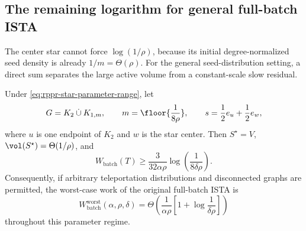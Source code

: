 \subsection{The remaining logarithm for general full-batch ISTA}
\label{subsec:rppr-direct-sum-lower}

The center star cannot force \(\log(1/\rho)\), because its initial
degree-normalized seed density is already \(1/m=\Theta(\rho)\).  For the
general seed-distribution setting, a direct sum separates the large active
volume from a constant-scale slow residual.

\begin{theorem}
\label{thm:rppr-direct-sum-lower}
Under \cref{eq:rppr-star-parameter-range}, let
\begin{equation}
    G=K_2\mathbin{\dot\cup}K_{1,m},
    \qquad
    m=\floor{\frac1{8\rho}},
    \qquad
    s=\frac12e_u+\frac12e_w,
    \label{eq:rppr-direct-sum-instance}
\end{equation}
where \(u\) is one endpoint of \(K_2\) and \(w\) is the star center.  Then
\(S^\star=V\), \(\vol(S^\star)=\Theta(1/\rho)\), and
\begin{equation}
    W_{\mathrm{batch}}(T)
    \geq
    \frac{3}{32\alpha\rho}
    \log\left(\frac{1}{8\delta\rho}\right).
    \label{eq:rppr-direct-sum-work-lower}
\end{equation}
Consequently, if arbitrary teleportation distributions and disconnected
graphs are permitted, the worst-case work of the original full-batch ISTA is
\begin{equation}
    W_{\mathrm{batch}}^{\mathrm{worst}}(\alpha,\rho,\delta)
    =
    \Theta\left(
        \frac{1}{\alpha\rho}
        \left[1+\log\frac{1}{\delta\rho}\right]
    \right)
    \label{eq:rppr-batch-general-tight}
\end{equation}
throughout this parameter regime.
\end{theorem}

